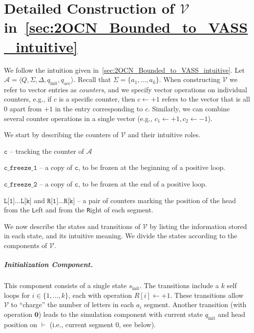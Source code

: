 \documentclass[USenglish]{lipics-v2021}
\newcommand{\tup}[1]{\langle #1 \rangle}
\newcommand{\lmark}{\vdash}
\newcommand{\initstate}{q_{\mathrm{init}}}
\newcommand{\accstate}{q_{\mathrm{acc}}}
\renewcommand{\vec}[1]{\boldsymbol{#1}}
\newcommand{\adds}[1]{\leftarrow #1}
\newcommand{\vf}[1]{\texttt{#1}}
\newcommand{\cA}{\mathcal{A}}
\newcommand{\cV}{\mathcal{V}}
\begin{document}



\newpage
\appendix
\section{Detailed Construction of $\cV$ in~\cref{sec:2OCN_Bounded_to_VASS_intuitive}}
\label{apx:2OCN_Bounded_to_VASS_formal} 
\label{sec:2OCN_Bounded_to_VASS_formal} 
We follow the intuition given in~\cref{sec:2OCN_Bounded_to_VASS_intuitive}. 
Let $\cA=\tup{Q,\Sigma,\Delta,\initstate,\accstate}$. Recall that $\Sigma=\{a_1,\ldots,a_k\}$. When
constructing $\cV$ we refer to vector entries as \emph{counters}, and we specify
vector operations on individual counters, e.g., if $c$ is a specific counter,
then $c\adds{+1}$ refers to the vector that is all $0$ apart from $+1$ in the
entry corresponding to $c$. Similarly, we can combine several counter operations
in a single vector (e.g., $c_1\adds{+1}, c_2\adds{-1}$).

We start by describing the counters of $\cV$ and their intuitive roles.
\begin{compactitem}
\item $\vf{c}$ -- tracking the counter of $\cA$
\item $\vf{c\_freeze\_1}$ -- a copy of $\vf{c}$, to be frozen at the
beginning of a positive loop.
\item $\vf{c\_freeze\_2}$ -- a copy of $\vf{c}$, to be frozen at the end of a
positive loop.
\item $\vf{L[1]}\ldots\vf{L[k]}$ and $\vf{R[1]}\ldots\vf{R[k]}$ -- a pair of counters
marking the position of the head from the \vf{L}eft and from the \vf{R}ight
of each segment.
\end{compactitem}

We now describe the states and transitions of $\cV$ by listing the information
stored in each state, and its intuitive meaning. We divide the states according
to the components of $\cV$.
\subparagraph*{Initialization Component.} This component consists of a single
state $s_{\textrm{init}}$. The transitions include a $k$ self loops for
$i\in \{1,\ldots,k\}$, each with operation $R[i]\adds{+1}$. These transitions allow
$\cV$ to ``charge'' the number of letters in each $a_i$ segment.  Another
transition (with operation $\vec{0}$) leads to the simulation component with
current state $\initstate$ and head position on $\lmark$ (i.e., current segment
$0$, see below).
\end{document}
